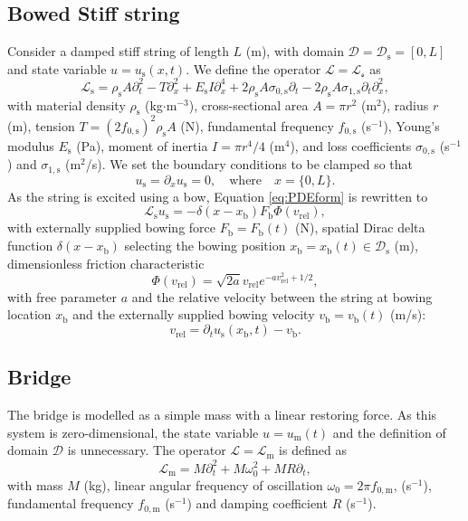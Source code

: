 \documentclass[dvipsnames]{article}
\begin{document}
\subsection{Bowed Stiff string}
Consider a damped stiff string of length $L$ (m), with domain $\mathcal{D} = \mathcal{D}_\text{s} = [0,L]$ and state variable $u = u_\text{s}(x,t)$. We define the operator $\mathcal{L} = \mathcal{L_\text{s}}$ as
\begin{equation}
    \mathcal{L}_\text{s} = \rho_\text{s} A \partial_t^2 - T\partial_x^2 + E_\text{s}I\partial_x^4+2\rho_\text{s} A\sigma_{0,\text{s}}\partial_t-2\rho_\text{s} A\sigma_{1,\text{s}}\partial_t\partial_x^2,
\end{equation}
with material density $\rho_\text{s}$ (kg$\cdot$m$^{-3}$), cross-sectional area $A = \pi r^2$ (m$^2$), radius $r$ (m), tension $T = (2f_{0,\text{s}})^2\rho_\text{s}A$ (N), fundamental frequency $f_{0,\text{s}}$ (s$^{-1}$), Young's modulus $E_\text{s}$ (Pa), moment of inertia $I=\pi r^4 / 4$ (m$^4$), and loss coefficients $\sigma_{0,\text{s}}$ (s$^{-1}$) and $\sigma_{1,\text{s}}$ (m$^2$/s). We set the boundary conditions to be clamped so that
\begin{equation}\label{boundary}
    u_\text{s} = \partial_xu_\text{s} = 0, \quad \text{where} \quad x = \{0, L\}.
\end{equation}
As the string is excited using a bow, Equation \eqref{eq:PDEform} is rewritten to
\begin{equation}\label{eq:bowedSting}
    \mathcal{L}_\text{s}u_\text{s} = -\delta(x-x_\text{b})F_\text{b}\Phi(v_\text{rel}),
\end{equation}
with externally supplied bowing force $F_\text{b} = F_\text{b}(t)$ (N), spatial Dirac delta function $\delta(x-x_\text{b})$ selecting the bowing position $x_\text{b} = x_\text{b}(t)\in \mathcal{D}_\text{s}$ (m), dimensionless friction characteristic
\begin{equation}
    \Phi(v_\text{rel}) = \sqrt{2a}v_\text{rel}e^{-av_\text{rel}^2+1/2},
\end{equation}
with free parameter $a$ and the relative velocity between the string at bowing location $x_\text{b}$ and the externally supplied bowing velocity $v_\text{b} = v_\text{b}(t)$ (m/s):
\begin{equation}
    v_\text{rel} = \partial_tu_\text{s}(x_\text{b},t) - v_\text{b}.
\end{equation}

\subsection{Bridge}
The bridge is modelled as a simple mass with a linear restoring force. As this system is zero-dimensional, the state variable $u = u_\text{m}(t)$ and the definition of domain $\mathcal{D}$ is unnecessary. The operator $\mathcal{L}=\mathcal{L}_\text{m}$ is defined as
\begin{equation}
    \mathcal{L}_\text{m}=M\partial_t^2+M\omega_0^2+MR\partial_t,
\end{equation}
with mass $M$ (kg), linear angular frequency of oscillation $\omega_0=2\pi f_{0,\text{m}}$,  (s$^{-1}$), fundamental frequency $f_{0,\text{m}}$ (s$^{-1}$) and damping coefficient $R$ (s$^{-1}$).
\end{document}
